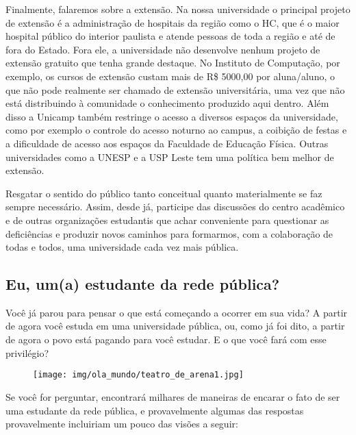 Finalmente, falaremos sobre a extensão. Na nossa universidade o principal
projeto de extensão é a administração de hospitais da região como o HC, que é o
maior hospital público do interior paulista e atende pessoas de toda a região e
até de fora do Estado. Fora ele, a universidade não desenvolve nenhum projeto
de extensão gratuito que tenha grande destaque. No Instituto de Computação, por
exemplo, os cursos de extensão custam mais de R\$ 5000,00 por aluna/aluno, o
que não pode realmente ser chamado de extensão universitária, uma vez que não
está distribuindo à comunidade o conhecimento produzido aqui dentro. Além disso
a Unicamp também restringe o acesso a diversos espaços da universidade, como
por exemplo o controle do acesso noturno ao campus, a coibição de festas e a
dificuldade de acesso aos espaços da Faculdade de Educação Física. Outras
universidades como a UNESP e a USP Leste tem uma política bem melhor de
extensão.

Resgatar o sentido do público tanto conceitual quanto materialmente se faz
sempre necessário. Assim, desde já, participe das discussões do centro
acadêmico e de outras organizações estudantis que achar conveniente para
questionar as deficiências e produzir novos caminhos para formarmos, com a
colaboração de todas e todos, uma universidade cada vez mais pública.

\subsection*{Eu, um(a) estudante da rede pública?}

Você já parou para pensar o que está começando a ocorrer em sua vida? A partir
de agora você estuda em uma universidade pública, ou, como já foi dito, a
partir de agora o povo está pagando para você estudar. E o que você fará com
esse privilégio?

\begin{figure}[h!]
  \centering
  \texttt{[image: img/ola\_mundo/teatro\_de\_arena1.jpg]}
\end{figure}

Se você for perguntar, encontrará milhares de maneiras de encarar o fato de ser
uma estudante da rede pública, e provavelmente algumas das respostas
provavelmente incluiriam um pouco das visões a seguir:


